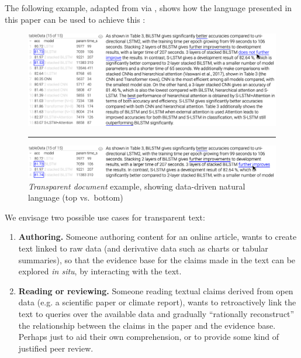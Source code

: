 The following example, adapted from \cite{zhang18} via \cite{moosavi21}, shows how the language presented in
this paper can be used to achieve this :

\begin{figure}%
    \centering
    \includegraphics[width=\linewidth]{fig/scigen-1805.02474v1-10-with-pointer.png}
    \vspace{1mm}
    \hrule
    \includegraphics[width=\linewidth]{fig/scigen-1805.02474v1-10-counterfactual-with-pointer.png}
    \caption{\emph{Transparent document} example, showing data-driven natural language (top
    vs.~bottom)}\label{fig:scigen-example-website}
\end{figure}

We envisage two possible use cases for transparent text:

\begin{enumerate}
\item \textbf{Authoring.} Someone authoring content for an online article, wants to create text
linked to raw data (and derivative data such as charts or tabular summaries), so that the evidence base for
the claims made in the text can be explored \emph{in situ}, by interacting with the text.

\item \textbf{Reading or reviewing.} Someone reading textual claims derived from open data (e.g. a
scientific paper or climate report), wants to retroactively link the text to queries over the available data
and gradually ``rationally reconstruct'' the relationship between the claims in the paper and the evidence
base. Perhaps just to aid their own comprehension, or to provide some kind of justified peer review.
\end{enumerate}

